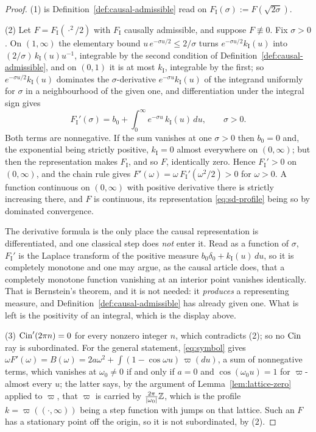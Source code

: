 \begin{proof}
(1) is Definition~\ref{def:causal-admissible} read on $F_{\mathrm I}(\sigma) := F(\sqrt{2\sigma})$.

(2) Let $F = F_{\mathrm I}(\cdot^2/2)$ with $F_{\mathrm I}$ causally admissible, and suppose
$F \not\equiv 0$. Fix $\sigma > 0$. On $(1,\infty)$ the elementary bound
$u\,e^{-\sigma u/2} \le 2/\sigma$ turns $e^{-\sigma u/2}k_{\mathrm I}(u)$ into
$(2/\sigma)\,k_{\mathrm I}(u)u^{-1}$, integrable by the second condition of
Definition~\ref{def:causal-admissible}, and on $(0,1)$ it is at most $k_{\mathrm I}$, integrable
by the first; so $e^{-\sigma u/2}k_{\mathrm I}(u)$ dominates the $\sigma$-derivative
$e^{-\sigma u}k_{\mathrm I}(u)$ of the integrand uniformly for $\sigma$ in a neighbourhood of
the given one, and differentiation under the integral sign gives
\[
  F_{\mathrm I}'(\sigma) = b_0 + \int_0^\infty e^{-\sigma u}\,k_{\mathrm I}(u)\,du,
  \qquad \sigma > 0 .
\]
Both terms are nonnegative. If the sum vanishes at one $\sigma > 0$ then $b_0 = 0$ and, the
exponential being strictly positive, $k_{\mathrm I} = 0$ almost everywhere on $(0,\infty)$;
but then the representation makes $F_{\mathrm I}$, and so $F$, identically zero. Hence
$F_{\mathrm I}' > 0$ on $(0,\infty)$, and the chain rule gives
$F'(\omega) = \omega\,F_{\mathrm I}'(\omega^2/2) > 0$ for $\omega > 0$. A function continuous
on $(0,\infty)$ with positive derivative there is strictly increasing there, and $F$ is
continuous, its representation \ref{eq:sd-profile} being so by dominated convergence.

The derivative formula is the only place the causal representation is differentiated, and one
classical step does \emph{not} enter it. Read as a function of $\sigma$, $F_{\mathrm I}'$ is
the Laplace transform of the positive measure $b_0\delta_0 + k_{\mathrm I}(u)\,du$, so it is
completely monotone and one may argue, as the causal article does, that a completely monotone
function vanishing at an interior point vanishes identically. That is Bernstein's theorem, and
it is not needed: it \emph{produces} a representing measure, and
Definition~\ref{def:causal-admissible} has already given one. What is left is the positivity of
an integral, which is the display above.

(3) $\operatorname{Cin}'(2\pi n) = 0$ for every nonzero integer $n$, which contradicts (2); so no $\operatorname{Cin}$ ray
is subordinated. For the general statement, \ref{eq:symbol} gives
$\omega F'(\omega) = B(\omega) = 2a\omega^2 + \int (1 - \cos\omega u)\,\varpi(du)$, a sum of
nonnegative terms, which vanishes at $\omega_0 \ne 0$ if and only if $a = 0$ and
$\cos(\omega_0 u) = 1$ for $\varpi$-almost every $u$; the latter says, by the argument of
Lemma~\ref{lem:lattice-zero} applied to $\varpi$, that $\varpi$ is carried by
$\tfrac{2\pi}{|\omega_0|}\mathbb{Z}$, which is the profile $k = \varpi((\cdot,\infty))$ being a step
function with jumps on that lattice. Such an $F$ has a stationary point off the origin, so it
is not subordinated, by (2).


\end{proof}
